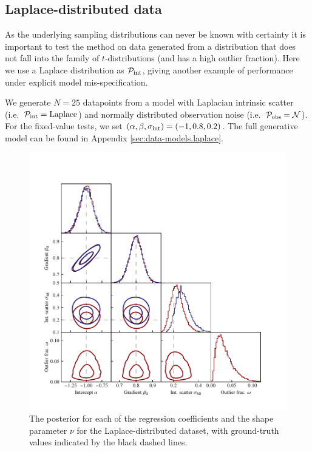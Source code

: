 \documentclass[fleqn,usenatbib]{rasti}
\begin{document}
\subsection{Laplace-distributed data}
\label{sec:results.laplace}

As the underlying sampling distributions can never be known with certainty it is important to test the method on data generated from a distribution that does not fall into the family of $t$-distributions (and has a high outlier fraction).  Here
we use a Laplace distribution as $\mathcal P_{\rm int}$, giving another example
of performance under explicit model mis-specification.

We generate $N = 25$ datapoints from a model with Laplacian intrinsic scatter
(i.e.\ $\mathcal P_{\rm int} = \mathrm{Laplace}$) and normally distributed observation
noise (i.e.\ $\mathcal P_{\rm obs} = \mathcal N$). For the fixed-value tests, we
set $(\alpha, \beta, \sigma_{\rm int}) = (-1, 0.8, 0.2)$. The full
generative model can be found in Appendix \ref{sec:data-models.laplace}.

\begin{figure}
    \includegraphics{graphics/fixed/corner_laplace.pdf}
    \caption{The posterior for each of the regression coefficients and the shape
    parameter $\nu$ for the Laplace-distributed dataset, with ground-truth
    values indicated by the black dashed lines.}
    \label{fig:results.laplace.corner}
\end{figure}
\end{document}
